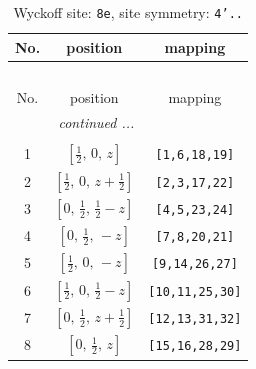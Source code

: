 \documentclass[fleqn,8pt]{jsarticle}
\begin{document}
\renewcommand{\arraystretch}{1.2}
\begin{longtable}{ccc}
\caption{Wyckoff site: {\tt 8e}, site symmetry: {\tt 4'..}}
 \\
 \hline \hline
No. & position & mapping \\ \hline \endfirsthead

\multicolumn{2}{l}{\tablename\ \thetable{}} \\
 \hline \hline
No. & position & mapping \\ \hline \endhead

 \hline \hline
\multicolumn{2}{r}{\footnotesize\it continued ...} \\ \endfoot

 \hline \hline
\multicolumn{2}{r}{} \\ \endlastfoot

1 & $\left[ \frac{1}{2},\, 0,\, z \right]$ & {\tt [1,6,18,19]} \\ \hline
2 & $\left[ \frac{1}{2},\, 0,\, z + \frac{1}{2} \right]$ & {\tt [2,3,17,22]} \\ \hline
3 & $\left[ 0,\, \frac{1}{2},\, \frac{1}{2} - z \right]$ & {\tt [4,5,23,24]} \\ \hline
4 & $\left[ 0,\, \frac{1}{2},\, - z \right]$ & {\tt [7,8,20,21]} \\ \hline
5 & $\left[ \frac{1}{2},\, 0,\, - z \right]$ & {\tt [9,14,26,27]} \\ \hline
6 & $\left[ \frac{1}{2},\, 0,\, \frac{1}{2} - z \right]$ & {\tt [10,11,25,30]} \\ \hline
7 & $\left[ 0,\, \frac{1}{2},\, z + \frac{1}{2} \right]$ & {\tt [12,13,31,32]} \\ \hline
8 & $\left[ 0,\, \frac{1}{2},\, z \right]$ & {\tt [15,16,28,29]} \\
\end{longtable}
\renewcommand{\arraystretch}{1.2}
\end{document}
